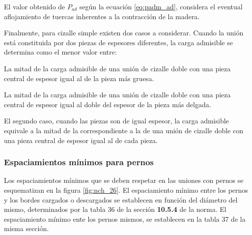 El valor obtenido de $P_{ad}$ según la ecuación \ref{eq:padm_ad}, considera el eventual aflojamiento de tuercas inherentes a la contracción de la madera.

Finalmente, para cizalle simple existen dos casos a considerar. Cuando la unión está constituida por dos piezas de espesores diferentes, la carga admisible se determina como el menor valor entre:
\begin{itemize*}
	\item La mitad de la carga admisible de una unión de cizalle doble con una pieza central de espesor igual al de la pieza más gruesa.
	\item La mitad de la carga admisible de una unión de cizalle doble con una pieza central de espesor igual al doble del espesor de la pieza más delgada.
\end{itemize*}
El segundo caso, cuando las piezas son de igual espesor, la carga admisible equivale a la mitad de la correspondiente a la de una unión de cizalle doble con una pieza central de espesor igual al de cada pieza.

\subsubsection{Espaciamientos mínimos para pernos}
\label{sec:espaciamiento_pernos}
Los espaciamientos mínimos que se deben respetar en las uniones con pernos se esquematizan en la figura \ref{fig:nch_26}. El espaciamiento mínimo entre los pernos y los bordes cargados o descargados se establecen en función del diámetro del mismo, determinados por la tabla 36 de la sección \textbf{10.5.4} de la norma. El espaciamiento mínimo ente los pernos mismos, se establecen en la tabla 37 de la misma sección. 

